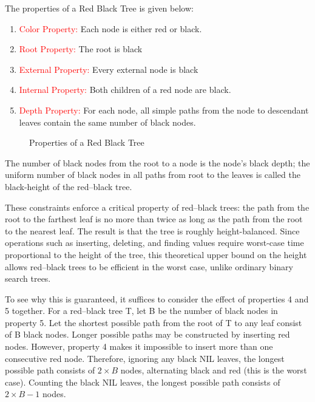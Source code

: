 \documentclass{article}[10pt]
\begin{document}
            The properties of a Red Black Tree is given below:
            \begin{enumerate}
                
                \item \textcolor{red}{Color Property:} Each node is either red or black.
                \item \textcolor{red}{Root Property:} The root is black
                \item \textcolor{red}{External Property:} Every external node is black
                \item \textcolor{red}{Internal Property:} Both children of a red node are black.
                \item \textcolor{red}{Depth Property:} For each node, all simple paths from the node to descendant leaves contain the same number of black nodes.
            \end{enumerate}

        
       \begin{figure}[h]
            
           \centering
            
           \caption{Properties of a Red Black Tree}
           \label{fig:Properties of RBT}
       \end{figure}
    
The number of black nodes from the root to a node is the node's black depth; the uniform number of black nodes in all paths from root to the leaves is called the black-height of the red–black tree.

These constraints enforce a critical property of red–black trees: the path from the root to the farthest leaf is no more than twice as long as the path from the root to the nearest leaf. The result is that the tree is roughly height-balanced. Since operations such as inserting, deleting, and finding values require worst-case time proportional to the height of the tree, this theoretical upper bound on the height allows red–black trees to be efficient in the worst case, unlike ordinary binary search trees.

To see why this is guaranteed, it suffices to consider the effect of properties 4 and 5 together. For a red–black tree T, let B be the number of black nodes in property 5. Let the shortest possible path from the root of T to any leaf consist of B black nodes. Longer possible paths may be constructed by inserting red nodes. However, property 4 makes it impossible to insert more than one consecutive red node. Therefore, ignoring any black NIL leaves, the longest possible path consists of $2 \times B$ nodes, alternating black and red (this is the worst case). Counting the black NIL leaves, the longest possible path consists of $2 \times B - 1$ nodes.
\end{document}
